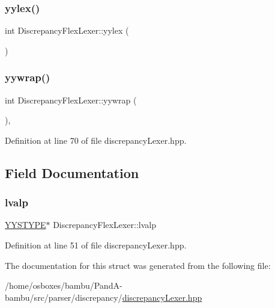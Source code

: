 \subsubsection{\texorpdfstring{yylex()}{yylex()}}
{\footnotesize\ttfamily int Discrepancy\+Flex\+Lexer\+::yylex (\begin{DoxyParamCaption}{ }\end{DoxyParamCaption})\hspace{0.3cm}{\ttfamily [override]}}

\mbox{\label{structDiscrepancyFlexLexer_a62b685d56c7b7ea966f872bf48f21d9d}} 
\subsubsection{\texorpdfstring{yywrap()}{yywrap()}}
{\footnotesize\ttfamily int Discrepancy\+Flex\+Lexer\+::yywrap (\begin{DoxyParamCaption}{ }\end{DoxyParamCaption})\hspace{0.3cm}{\ttfamily [inline]}, {\ttfamily [override]}}



Definition at line 70 of file discrepancy\+Lexer.\+hpp.



\subsection{Field Documentation}
\mbox{\label{structDiscrepancyFlexLexer_a9cc961a546980b0c59b4074bd9205d00}} 
\subsubsection{\texorpdfstring{lvalp}{lvalp}}
{\footnotesize\ttfamily \hyperlink{asn__parser_8cpp_a2ceb5b985e149f18e018b142cfdd7264}{Y\+Y\+S\+T\+Y\+PE}$\ast$ Discrepancy\+Flex\+Lexer\+::lvalp}



Definition at line 51 of file discrepancy\+Lexer.\+hpp.



The documentation for this struct was generated from the following file\+:\begin{DoxyCompactItemize}
\item 
/home/osboxes/bambu/\+Pand\+A-\/bambu/src/parser/discrepancy/\hyperlink{discrepancyLexer_8hpp}{discrepancy\+Lexer.\+hpp}\end{DoxyCompactItemize}

